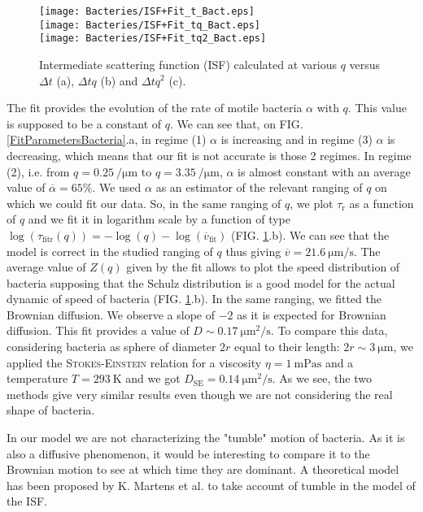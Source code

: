 \documentclass[%
 aip,
 jmp,%
 amsmath,amssymb,
reprint,%
]{revtex4-1}
\begin{document}
\begin{figure}
	\texttt{[image: Bacteries/ISF+Fit\_t\_Bact.eps]}\\
	\texttt{[image: Bacteries/ISF+Fit\_tq\_Bact.eps]}\\
	\texttt{[image: Bacteries/ISF+Fit\_tq2\_Bact.eps]}
	\caption{Intermediate scattering function (ISF) calculated at various $q$ versus $\Delta t$ (a), $\Delta tq$ (b) and $\Delta tq^2$ (c).}
	\label{ISFBacteria}
\end{figure}

The fit provides the evolution of the rate of motile bacteria $\alpha$ with $q$. This value is supposed to be a constant of $q$. We can see that, on FIG. \ref{FitParametersBacteria}.a, in regime (1) $\alpha$ is increasing and in regime (3) $\alpha$ is decreasing, which means that our fit is not accurate is those 2 regimes. In regime (2), i.e. from $q = \SI{0.25}{\per\micro\meter}$ to $q = \SI{3.35}{\per\micro\meter}$, $\alpha$ is almost constant with an average value of $\overline{\alpha} = 65\%$. We used $\alpha$ as an estimator of the relevant ranging of $q$ on which we could fit our data. So, in the same ranging of $q$, we plot $\tau_\text{r}$ as a function of $q$ and we fit it in logarithm scale by a function of type $\log(\tau_\text{fitr}(q)) = -\log(q) - \log(\overline{v}_\text{fit})$ (FIG. \ref{ISFBacteria}.b). We can see that the model is correct in the studied ranging of $q$ thus giving $\overline{v} = \SI{21.6}{\micro\meter\per\second}$. The average value of $Z(q)$ given by the fit allows to plot the speed distribution of bacteria supposing that the Schulz distribution is a good model for the actual dynamic of speed of bacteria (FIG. \ref{ISFBacteria}.b). In the same ranging, we fitted the Brownian diffusion. We observe a slope of $-2$ as it is expected for Brownian diffusion. This fit provides a value of $D \sim \SI{0.17}{\micro\meter\squared\per\second}$. To compare this data, considering bacteria as sphere of diameter $2r$ equal to their length: $2r \sim \SI{3}{\micro\meter}$, we applied the \textsc{Stokes-Einstein} relation for a viscosity $\eta = \SI{1}{\milli\pascal\second}$ and a temperature $T=\SI{293}{\kelvin}$ and we got $D_\text{SE} = \SI{0.14}{\micro\meter\squared\per\second}$. As we see, the two methods give very similar results even though we are not considering the real shape of bacteria.

In our model we are not characterizing the "tumble" motion of bacteria. As it is also a diffusive phenomenon, it would be interesting to compare it to the Brownian motion to see at which time they are dominant. A theoretical model has been proposed by K. Martens et al. \cite{6_martens2012probability} to take account of tumble in the model of the ISF.
\end{document}

